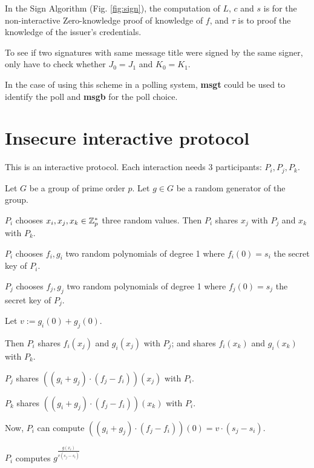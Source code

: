 In the Sign Algorithm (Fig. \ref{fig:sign}), the computation of $L$, $c$ and $s$ is for the non-interactive Zero-knowledge proof of knowledge of $f$, and $\tau$ is to proof the knowledge of the issuer's credentials.

To see if two signatures with same message title were signed by the same signer, only have to check whether $J_0 = J_1$ and $K_0 = K_1$.

In the case of using this scheme in a polling system, \textbf{msgt} could be used to identify the poll and \textbf{msgb} for the poll choice.

\section{Insecure interactive protocol}

This is an interactive protocol. Each interaction needs 3 participants: $P_i,P_j,P_k$.

Let $G$ be a group of prime order $p$. Let $g \in G$ be a random generator of the group.

$P_i$ chooses $x_i, x_j, x_k \in {\mathbb Z}^*_p$ three random values. Then $P_i$ shares $x_j$ with $P_j$ and $x_k$ with $P_k$.

$P_i$ chooses $f_i, g_i$ two random polynomials of degree 1 where $f_i(0)=s_i$ the secret key of $P_i$.

$P_j$ chooses $f_j, g_j$ two random polynomials of degree 1 where $f_j(0) = s_j$ the secret key of $P_j$.

Let $v := g_i(0) + g_j(0)$.

Then $P_i$ shares $f_i(x_j)$ and $g_i(x_j)$ with $P_j$; and shares $f_i(x_k)$ and $g_i(x_k)$ with $P_k$.

$P_j$ shares $((g_i + g_j) \cdot (f_j - f_i))(x_j)$ with $P_i$.

$P_k$ shares $((g_i + g_j) \cdot (f_j - f_i))(x_k)$ with $P_i$.

Now, $P_i$ can compute $\left( (g_i + g_j)\cdot (f_j - f_i) \right)(0) = v \cdot (s_j - s_i)$.

$P_i$ computes $g^{\frac{g(x_i)}{v(s_j -s_i)}}$

